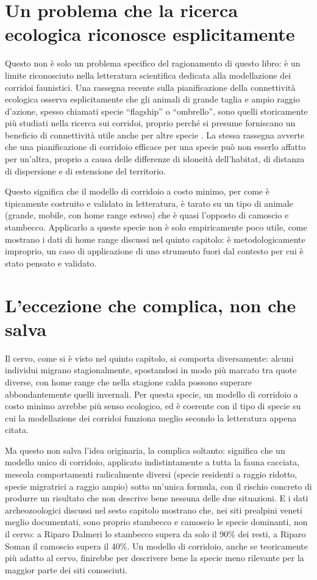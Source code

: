 \section{Un problema che la ricerca ecologica riconosce esplicitamente}

Questo non è solo un problema specifico del ragionamento di questo libro: è un limite riconosciuto nella letteratura scientifica dedicata alla modellazione dei corridoi faunistici. Una rassegna recente sulla pianificazione della connettività ecologica osserva esplicitamente che gli animali di grande taglia e ampio raggio d'azione, spesso chiamati specie ``flagship'' o ``ombrello'', sono quelli storicamente più studiati nella ricerca sui corridoi, proprio perché si presume forniscano un beneficio di connettività utile anche per altre specie \citep{bohnett2024}. La stessa rassegna avverte che una pianificazione di corridoio efficace per una specie può non esserlo affatto per un'altra, proprio a causa delle differenze di idoneità dell'habitat, di distanza di dispersione e di estensione del territorio.

Questo significa che il modello di corridoio a costo minimo, per come è tipicamente costruito e validato in letteratura, è tarato su un tipo di animale (grande, mobile, con home range esteso) che è quasi l'opposto di camoscio e stambecco. Applicarlo a queste specie non è solo empiricamente poco utile, come mostrano i dati di home range discussi nel quinto capitolo: è metodologicamente improprio, un caso di applicazione di uno strumento fuori dal contesto per cui è stato pensato e validato.

\section{L'eccezione che complica, non che salva}

Il cervo, come si è visto nel quinto capitolo, si comporta diversamente: alcuni individui migrano stagionalmente, spostandosi in modo più marcato tra quote diverse, con home range che nella stagione calda possono superare abbondantemente quelli invernali. Per questa specie, un modello di corridoio a costo minimo avrebbe più senso ecologico, ed è coerente con il tipo di specie su cui la modellazione dei corridoi funziona meglio secondo la letteratura appena citata.

Ma questo non salva l'idea originaria, la complica soltanto: significa che un modello unico di corridoio, applicato indistintamente a tutta la fauna cacciata, mescola comportamenti radicalmente diversi (specie residenti a raggio ridotto, specie migratrici a raggio ampio) sotto un'unica formula, con il rischio concreto di produrre un risultato che non descrive bene nessuna delle due situazioni. E i dati archeozoologici discussi nel sesto capitolo mostrano che, nei siti prealpini veneti meglio documentati, sono proprio stambecco e camoscio le specie dominanti, non il cervo: a Riparo Dalmeri lo stambecco supera da solo il 90\% dei resti, a Riparo Soman il camoscio supera il 40\%. Un modello di corridoio, anche se teoricamente più adatto al cervo, finirebbe per descrivere bene la specie meno rilevante per la maggior parte dei siti conosciuti.

